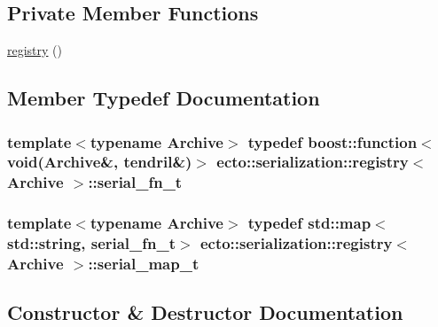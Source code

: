 \subsection*{Private Member Functions}
\begin{DoxyCompactItemize}
\item 
\hyperlink{structecto_1_1serialization_1_1registry_acbf5b14a8ef87e8a1324ad852e3e3f13}{registry} ()
\end{DoxyCompactItemize}


\subsection{Member Typedef Documentation}
\subsubsection[{\texorpdfstring{serial\+\_\+fn\+\_\+t}{serial_fn_t}}]{\setlength{\rightskip}{0pt plus 5cm}template$<$typename Archive$>$ typedef boost\+::function$<$void(Archive\&, {\bf tendril}\&)$>$ {\bf ecto\+::serialization\+::registry}$<$ Archive $>$\+::{\bf serial\+\_\+fn\+\_\+t}}\hypertarget{structecto_1_1serialization_1_1registry_a9bbc5358e0b5bb519983c16db9c6391b}{}\label{structecto_1_1serialization_1_1registry_a9bbc5358e0b5bb519983c16db9c6391b}
\subsubsection[{\texorpdfstring{serial\+\_\+map\+\_\+t}{serial_map_t}}]{\setlength{\rightskip}{0pt plus 5cm}template$<$typename Archive$>$ typedef std\+::map$<$std\+::string, {\bf serial\+\_\+fn\+\_\+t}$>$ {\bf ecto\+::serialization\+::registry}$<$ Archive $>$\+::{\bf serial\+\_\+map\+\_\+t}}\hypertarget{structecto_1_1serialization_1_1registry_a89253dc4749e297b132dacb9e14967c2}{}\label{structecto_1_1serialization_1_1registry_a89253dc4749e297b132dacb9e14967c2}


\subsection{Constructor \& Destructor Documentation}
